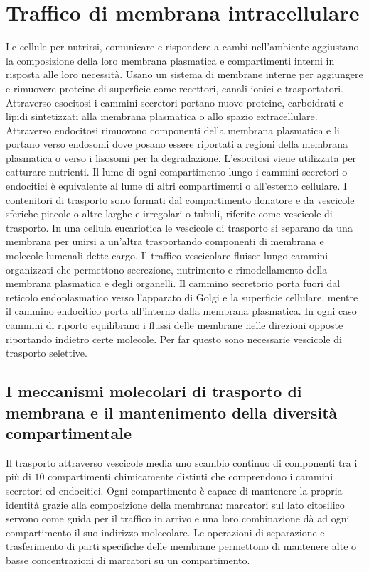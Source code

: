 \chapter{Traffico di membrana intracellulare}
Le cellule per nutrirsi, comunicare e rispondere a cambi nell'ambiente aggiustano la composizione della loro membrana plasmatica e compartimenti interni in risposta alle loro 
necessit\`a. Usano un sistema di membrane interne per aggiungere e rimuovere proteine di superficie come recettori, canali ionici e trasportatori. Attraverso esocitosi i cammini 
secretori portano nuove proteine, carboidrati e lipidi sintetizzati alla membrana plasmatica o allo spazio extracellulare. Attraverso endocitosi rimuovono componenti della membrana 
plasmatica e li portano verso endosomi dove posano essere riportati a regioni della membrana plasmatica o verso i lisosomi per la degradazione. L'esocitosi viene utilizzata per 
catturare nutrienti. Il lume di ogni compartimento lungo i cammini secretori o endocitici \`e equivalente al lume di altri compartimenti o all'esterno cellulare. I contenitori
di trasporto sono formati dal compartimento donatore e da vescicole sferiche piccole o altre larghe e irregolari o tubuli, riferite come vescicole di trasporto. In una cellula 
eucariotica le vescicole di trasporto si separano da una membrana per unirsi a un'altra trasportando componenti di membrana e molecole lumenali dette cargo. Il traffico vescicolare
fluisce lungo cammini organizzati che permettono secrezione, nutrimento e rimodellamento della membrana plasmatica e degli organelli. Il cammino secretorio porta fuori dal reticolo 
endoplasmatico verso l'apparato di Golgi e la superficie cellulare, mentre il cammino endocitico porta all'interno dalla membrana plasmatica. In ogni caso cammini di riporto equilibrano
i flussi delle membrane nelle direzioni opposte riportando indietro certe molecole. Per far questo sono necessarie vescicole di trasporto selettive. 
\section{I meccanismi molecolari di trasporto di membrana e il mantenimento della diversit\`a compartimentale}
Il trasporto attraverso vescicole media uno scambio continuo di componenti tra i pi\`u di $10$ compartimenti chimicamente distinti che comprendono i cammini secretori ed endocitici. 
Ogni compartimento \`e capace di mantenere la propria identit\`a grazie alla composizione della membrana: marcatori sul lato citosilico servono come guida per il traffico in arrivo e 
una loro combinazione d\`a ad ogni compartimento il suo indirizzo molecolare. Le operazioni di separazione e trasferimento di parti specifiche delle membrane permettono di mantenere
alte o basse concentrazioni di marcatori su un compartimento. 
